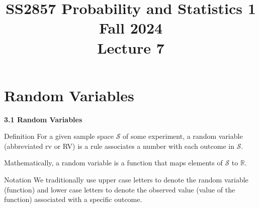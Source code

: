 \documentclass[aspectratio=169,xcolor=pdftex,dvipsnames,table]{beamer}\usepackage[]{graphicx}\usepackage[]{xcolor}
\title[SS2857 -- Lecture 7]{SS2857 Probability and Statistics 1\\
  Fall 2024\\
  \vspace{.2in}
  Lecture 7}
\date{}
\begin{document}
{

\begin{frame}
  \addtocounter{framenumber}{-1}

  \maketitle
\end{frame}
}

\section{Random Variables}

\begin{frame}{}

  \begin{center}
    \Large{\textbf{3.1 Random Variables}}
  \end{center}

\end{frame}

\begin{frame}

  \begin{block}{Definition}
    For a given sample space $\mathcal S$ of some experiment, a random variable (abbreviated rv or RV) is a rule associates a number with each outcome in $\mathcal S$.

    \medskip

    Mathematically, a random variable is a function that maps elements of $\mathcal S$ to $\mathbb R$.
  \end{block}
\end{frame}

\begin{frame}

  \begin{block}{Notation}
    We traditionally use upper case letters to denote the random variable (function) and lower case letters to denote the observed value (value of the function) associated with a specific outcome.
  \end{block}

\end{frame}
\end{document}
